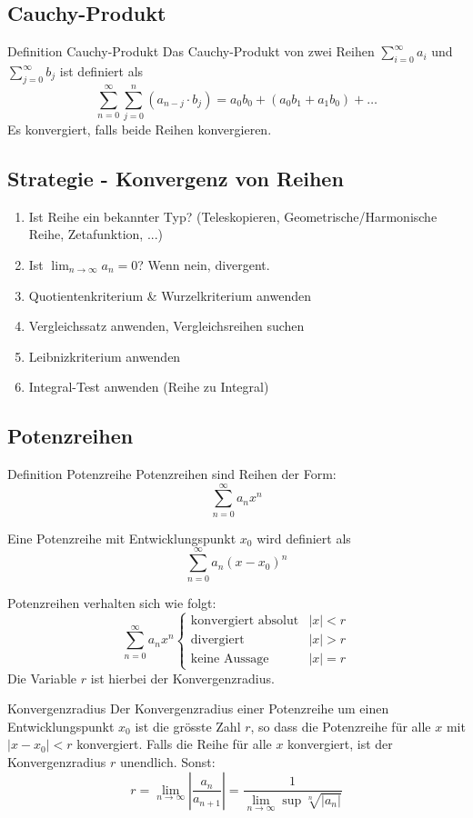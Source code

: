 \documentclass[a4paper,10pt]{article}
\def\limn{\lim_{n\to \infty}}
\begin{document}
\subsection{Cauchy-Produkt}
\begin{subbox}{Definition Cauchy-Produkt}
	Das Cauchy-Produkt von zwei Reihen $\sum_{i = 0}^\infty a_i$ und $\sum_{j = 0}^\infty b_j$ ist definiert als
	$$\sum_{n=0}^\infty \sum_{j=0}^n (a_{n-j} \cdot b_j) = a_0b_0 + (a_0b_1 + a_1b_0) + \ldots$$ Es konvergiert, falls beide Reihen konvergieren.
\end{subbox}

\subsection{Strategie - Konvergenz von Reihen}
\begin{enumerate}
	\item Ist Reihe ein bekannter Typ? (Teleskopieren, Geometrische/Harmonische Reihe, Zetafunktion, ...)
	\item Ist $\limn a_n = 0$? Wenn nein, divergent.
	\item Quotientenkriterium \& Wurzelkriterium anwenden
	\item Vergleichssatz anwenden, Vergleichsreihen suchen
	\item Leibnizkriterium anwenden
	\item Integral-Test anwenden (Reihe zu Integral)
\end{enumerate}

\subsection{Potenzreihen}
\begin{subbox}{Definition Potenzreihe}
	Potenzreihen sind Reihen der Form:
	$$\sum_{n=0}^\infty a_n x^n$$
	 
	Eine Potenzreihe mit Entwicklungspunkt $x_0$ wird definiert als 
	$$\sum_{n=0}^\infty a_n(x-x_0)^n$$
	 
	Potenzreihen verhalten sich wie folgt:
	$$
	\sum_{n=0}^\infty a_n x^n\begin{cases}
	\text{konvergiert absolut} &|x| < r\\
	\text{divergiert} &|x| > r\\
	\text{keine Aussage} &|x| = r
	\end{cases}
	$$
	Die Variable $r$ ist hierbei der Konvergenzradius.
\end{subbox}

\begin{mainbox}{Konvergenzradius}
	Der Konvergenzradius einer Potenzreihe um einen Entwicklungspunkt $x_0$ ist die grösste Zahl $r$, so dass die Potenzreihe für alle $x$ mit $|x - x_0| < r$ konvergiert. Falls die Reihe für alle $x$ konvergiert, ist der Konvergenzradius $r$ unendlich. Sonst:
	$$r = \limn \left| \frac{a_n}{a_{n+1}} \right| = \frac{1}{\limn\sup \sqrt[n]{|a_n|}} $$
\end{mainbox}
\end{document}
